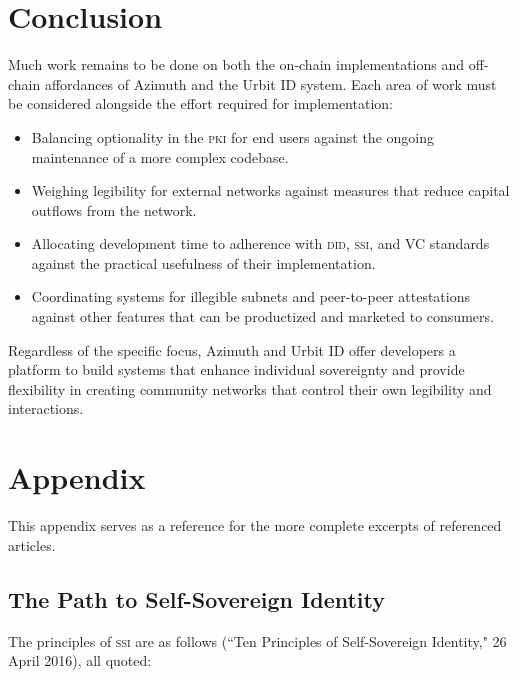 \documentclass[twoside]{article}
\begin{document}
\section{Conclusion}

Much work remains to be done on both the on-chain implementations and off-chain affordances of Azimuth and the Urbit ID system. Each area of work must be considered alongside the effort required for implementation:

\begin{itemize}
  \item  Balancing optionality in the \textsc{pki} for end users against the ongoing maintenance of a more complex codebase.
  \item  Weighing legibility for external networks against measures that reduce capital outflows from the network.
  \item  Allocating development time to adherence with \textsc{did}, \textsc{ssi}, and VC standards against the practical usefulness of their implementation.
  \item  Coordinating systems for illegible subnets and peer-to-peer attestations against other features that can be productized and marketed to consumers.
\end{itemize}

Regardless of the specific focus, Azimuth and Urbit ID offer developers a platform to build systems that enhance individual sovereignty and provide flexibility in creating community networks that control their own legibility and interactions.\tombstone{}


\section{Appendix}

This appendix serves as a reference for the more complete excerpts of referenced articles.

\subsection{The Path to Self-Sovereign Identity}

The principles of \textsc{ssi} are as follows (``Ten Principles of Self-Sovereign Identity," 26 April 2016), all quoted:
\end{document}

